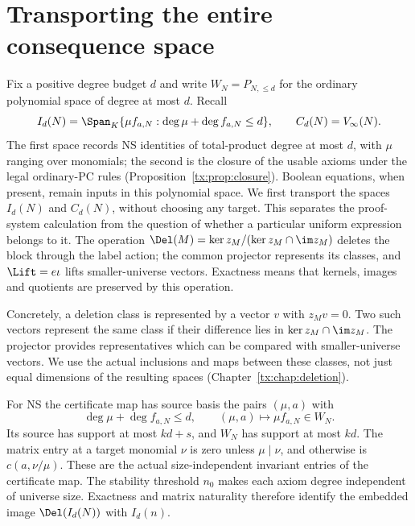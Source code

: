 \section{Transporting the entire consequence space}
Fix a positive degree budget $d$ and write $W_N=P_{N,\le d}$
for the ordinary polynomial space of degree at most $d$. Recall
\[
 I_d(N)=\Span_K\{\mu f_{a,N}:\deg\mu+\deg f_{a,N}\le d\},
 \qquad C_d(N)=V_\infty(N).
\]
The first space records NS identities of total-product degree at most
$d$, with $\mu$ ranging over monomials; the second is the closure of the usable axioms under the legal
ordinary-PC rules (Proposition~\ref{tx:prop:closure}). Boolean equations,
when present, remain inputs in this polynomial space.
We first transport the spaces $I_d(N)$ and $C_d(N)$, without choosing
any target. This separates the proof-system calculation from the
question of whether a particular uniform expression belongs to it.
The operation $\Del(M)=\ker z_M/(\ker z_M\cap\im z_M)$ deletes the
block through the label action; the common projector represents its
classes, and $\Lift=e\iota$ lifts smaller-universe vectors. Exactness means
that kernels, images and quotients are preserved by this operation.

Concretely, a deletion class is represented by a vector $v$ with
$z_Mv=0$. Two such vectors represent the same class if their difference
lies in $\ker z_M\cap\im z_M$. The projector provides representatives
which can be compared with smaller-universe vectors. We use the actual
inclusions and maps between these classes, not just equal dimensions
of the resulting spaces (Chapter~\ref{tx:chap:deletion}).

For NS the certificate map has source basis the pairs $(\mu,a)$ with
\[
 \deg\mu+\deg f_{a,N}\le d,
 \qquad (\mu,a)\longmapsto\mu f_{a,N}\in W_N.
\]
Its source has support at most $kd+s$, and $W_N$ has support at most
$kd$. The matrix entry at a target monomial $\nu$ is zero unless
$\mu\mid\nu$, and otherwise is $c(a,\nu/\mu)$. These are the actual
size-independent invariant entries of the certificate map. The
stability threshold $n_0$ makes each axiom degree independent of universe size.
Exactness and matrix naturality therefore identify the embedded image
$\Del(I_d(N))$ with $I_d(n)$.

